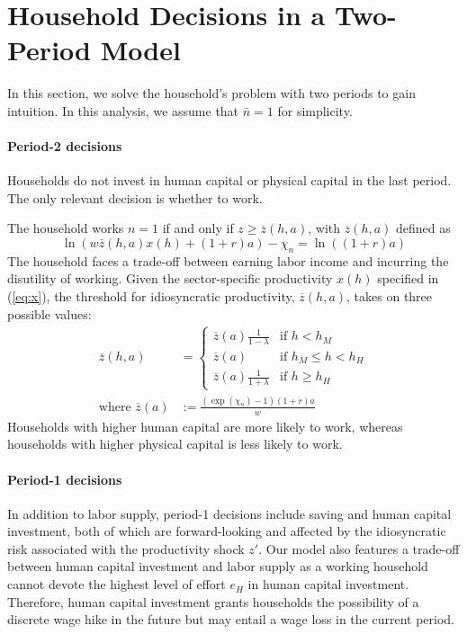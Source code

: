 \documentclass[12pt,english]{article}
\numberwithin{equation}{section}
\begin{document}
\section{Household Decisions in a Two-Period Model}
In this section, we solve the household's problem with two periods to gain intuition. In this analysis, we assume that $\bar{n}=1$ for simplicity.


\paragraph{Period-2 decisions}\label{sec:period2}
Households do not invest in human capital or physical capital in the last period. The only relevant decision is whether to work. 

The household works $n=1$ if and only if $z\geq\overline{z}(h,a)$, with $\overline{z}(h,a) $ defined as 
\begin{equation}
    \ln(w\overline{z}(h,a)x(h)+(1+r)a)-\chi_n = \ln((1+r)a)
\end{equation}
The household faces a trade-off between earning labor income and incurring the disutility of working. 
Given the sector-specific productivity $x(h)$ specified in (\ref{eq:x}), the threshold for idiosyncratic productivity, $\overline{z}(h,a)$, takes on three possible values:
\begin{align}
    \label{eq:z-period2}
\overline{z}(h,a)&=\left \{ 
\begin{array}{cl}
\overline{z}(a)\frac{1}{1-\lambda}  & \text{if }h<h_{M} \\ 
\overline{z}(a) & \text{if }h_{M} \leq h<h_{H} \\ 
\overline{z}(a)\frac{1}{1+\lambda}   & \text{if }h \geq h_{H}%
\end{array}%
\right. \\
\text{where }\overline{z}(a)&:=\frac{(\exp(\chi_n)-1)(1+r)a}{w}
\end{align}
Households with higher human capital are more likely to work, whereas households with higher physical capital is less likely to work. 

\paragraph{Period-1 decisions}\label{sec:period1}
In addition to labor supply, period-1 decisions include saving and human capital investment, both of which are forward-looking and affected by the idiosyncratic risk associated with the productivity shock $z'$. 
Our model also features a trade-off between human capital investment and labor supply as a working household cannot devote the highest level of effort $e_H$ in human capital investment. Therefore, human capital investment grants households the possibility of a discrete wage hike in the future but may entail a wage loss in the current period. 
\end{document}
